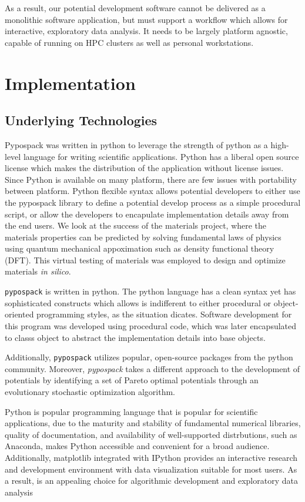 As a result, our potential development software cannot be delivered as a monolithic software application, but must support a workflow which allows for interactive, exploratory data analysis.  It needs to be largely platform agnostic, capable of running on HPC clusters as well as personal workstations.

\section{Implementation}

\subsection{Underlying Technologies}

Pypospack was written in python to leverage the strength of python as a high-level language for writing scientific applications.  Python has a liberal open source license which makes the distribution of the application without license issues.  Since Python is available on many platform, there are few issues with portability between platform.  Python flexible syntax allows potential developers to either use the pypospack library to define a potential develop process as a simple procedural script, or allow the developers to encapulate implementation details away from the end users.  We look at the success of the materials project, where the materials properties can be predicted by solving fundamental laws of physics using quantum mechanical appoximation such as density functional theory (DFT).  This virtual testing of materials was employed to design and optimize materials \emph{in silico}.

\verb|pypospack| is written in python.  The python language has a clean syntax yet has sophisticated constructs which allows is indifferent to either procedural or object-oriented programming styles, as the situation dicates.  Software development for this program was developed using procedural code, which was later encapsulated to classs object to abstract the implementation details into base objects.

Additionally, \verb|pypospack| utilizes popular, open-source packages from the python community.
Moreover, \emph{pypospack} takes a different approach to the development of potentials by identifying a set of Pareto optimal potentials through an evolutionary stochastic optimization algorithm.

Python is popular programming language that is popular for scientific applications, due to the maturity and stability of fundamental numerical libraries, quality of documentation, and availability of well-supported distrbutions, such as Anaconda\cite{python_anaconda}, makes Python accessible and convenient for a broad audience.  Additionally, matplotlib\cite{hunter2007_matplotlib} integrated with IPython\cite{} provides an interactive research and development environment with data visualization suitable for most users.  As a result, is an appealing choice for algorithmic development and exploratory data analysis\cite{dubois2007_python}

